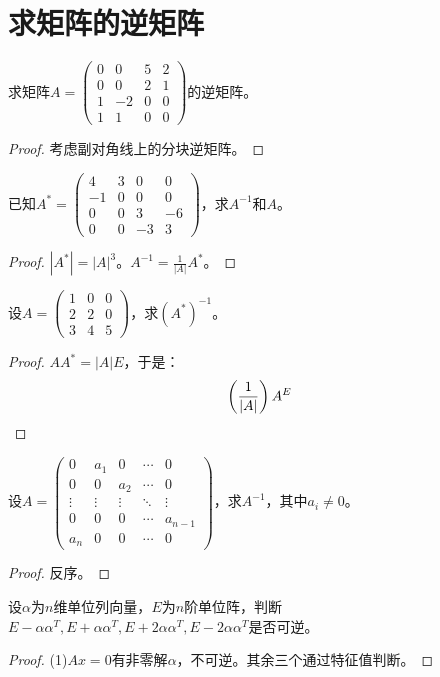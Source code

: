 \section{求矩阵的逆矩阵}
\begin{theorem}
	求矩阵$A=
	\begin{pmatrix}
		0 & 0 & 5 & 2 \\
		0 & 0 & 2 & 1 \\
		1 & -2 & 0 & 0 \\
		1 & 1 & 0 & 0
	\end{pmatrix}$的逆矩阵。
\end{theorem}
\begin{proof}
	考虑副对角线上的分块逆矩阵。
\end{proof}
\begin{theorem}
	已知$A^*=\begin{pmatrix}
		4 & 3 & 0 & 0 \\
		-1 & 0 & 0 & 0 \\
		0 & 0 & 3 & -6 \\
		0 & 0 & -3 & 3
	\end{pmatrix}$，求$A^{-1}$和$A$。
\end{theorem}
\begin{proof}
		$|A^*|=|A|^3$。$A^{-1}=\frac{1}{|A|}A^*$。
\end{proof}
\begin{theorem}
	设$A=
	\begin{pmatrix}
		1 & 0 & 0 \\
		2 & 2 & 0 \\
		3 & 4 & 5
	\end{pmatrix}$，求$(A^*)^{-1}$。
\end{theorem}
\begin{proof}
	$AA^*=|A|E$，于是：
	\begin{equation*}
		\left(\frac{1}{|A|}\right)A^E\qedhere
	\end{equation*}
\end{proof}
\begin{theorem}
	设$A=
	\begin{pmatrix}
		0 & a_1 & 0 & \cdots & 0 \\
		0 & 0 & a_2 & \cdots & 0 \\
		\vdots & \vdots & \vdots & \ddots & \vdots \\
		0 & 0 & 0 & \cdots & a_{n-1} \\
		a_n & 0 & 0 & \cdots & 0
	\end{pmatrix}$，求$A^{-1}$，其中$a_i\ne0$。
\end{theorem}
\begin{proof}
	反序。
\end{proof}
\begin{theorem}
	设$\alpha$为$n$维单位列向量，$E$为$n$阶单位阵，判断$E-\alpha\alpha^T,E+\alpha\alpha^T,E+2\alpha\alpha^T,E-2\alpha\alpha^T$是否可逆。
\end{theorem}
\begin{proof}
	(1)$Ax=0$有非零解$\alpha$，不可逆。其余三个通过特征值判断。
\end{proof}

